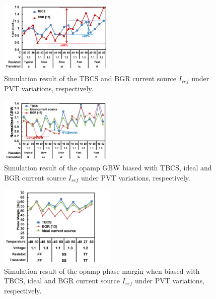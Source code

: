 \documentclass[paper]{ieice}
\begin{document}
\begin{figure}[!t]
\centering
 \includegraphics[width=0.5\textwidth]{figs/pvt.png}
  \caption{Simulation result of the TBCS and BGR current source $I_{ref}$ under PVT variations, respectively.
}
\label{iref_pvt_both}
\end{figure}

\begin{figure}[!t]
\centering
 \includegraphics[width=0.5\textwidth]{figs/pvt_gbw.png}
  \caption{Simulation result of the opamp GBW biased with TBCS, ideal and BGR current source $I_{ref}$ under PVT variations, respectively.
}
\label{iref_gbw}
\end{figure}

\begin{figure}[!t]
\centering
 \includegraphics[width=0.5\textwidth]{figs/phasemargin.png}
  \caption{Simulation result of the opamp phase margin when biased with TBCS, ideal and BGR current source $I_{ref}$ under PVT variations, respectively.
}
\label{opamp_pm}
\end{figure}
\end{document}
